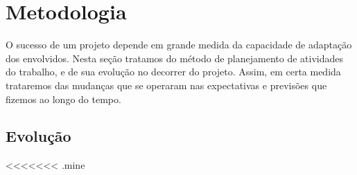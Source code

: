 \chapter{Metodologia}

O sucesso de um projeto depende em grande medida da capacidade de
adaptação dos envolvidos. Nesta seção tratamos do método de
planejamento de atividades do trabalho, e de sua evolução no decorrer
do projeto. Assim, em certa medida trataremos das mudanças que se
operaram nas expectativas e previsões que fizemos ao longo do tempo.

\section{Evolução}

<<<<<<< .mine
\begin{comment}
\begin{enumerate}
\item Levantamento de atividades e assuntos a pesquisar, cronograma
  preliminar (de pesquisas), criação de diário de bordo.%
=======
Nesta seção discorre-se brevemente sobre as atividades desenvolvidas durante o projeto, desde sua especificação às etapas finais de sua implementação.
>>>>>>> .r109

A ideia de desenvolvimento de um projeto no campo de jogos nasceu há mais de um ano, e diversos assuntos foram elencados como possíveis temas para o projeto de conclusão de curso. Mas foi somente em março de 2010 que a equipe se consolidou e o professor doutor Ricardo Nakamura aceitou orientar o grupo, dando início ao processo de refinamento do tema do trabalho. Foi então que entramos em contato com o professor doutor Roberto Cezar Bianchini, co-orientador do projeto, e autor da tese de doutoramento~\cite{tese_roberto} que sugeriu o tema do presente estudo de caso.  

As primeiras atividades do grupo então concentraram-se na elaboração de um primeiro cronograma, e foram selecionados assuntos a pesquisar. Nesse ponto foi iniciada a composição de um diário de bordo, em que se registrou todo o avanço do projeto.

O passo seguinte foi solidificar as condições de contorno do problema, por meio de reuniões em que se procurou unificar a visão dos envolvidos, progredindo gradualmente rumo a uma concepção amadurecida dos objetivos e métodos a serem empregados no projeto.

Após diversas reuniões, o grupo optou por utilizar uma linguagem de presença expressiva na idústria: C++ (conforme justificado na seção~\ref{tecnologias_empregadas}); além disso, estipulou-se que o projeto teria uma licença livre.


\end{comment}
